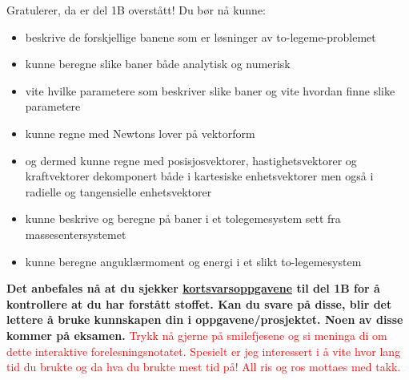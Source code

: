 \documentclass{beamer}
\let\hrefori\href
\renewcommand{\href}[2]{{\setlength{\fboxsep}{1pt}\colorbox{sunset}{\hrefori{#1}{#2}}}}
\newcommand{\pagebutton}[1]{\setbeamertemplate{button}{\tikz\node[inner xsep = 5pt, draw = structure!90, fill = green(ryb), rounded corners = 8pt]{\color{amber}\Large\insertbuttontext};}\beamerbutton{#1}}
\begin{document}
\begin{frame}
\label{oppsummering}
\hyperlink{koding3}{\pagebutton{\small Forrige side}}\href{https://nettskjema.no/a/158672}{ \Changey[1][yellow]{-2}}
Gratulerer, da er del 1B overstått! Du bør nå kunne:
\begin{itemize}
\item beskrive de forskjellige banene som er løsninger av to-legeme-problemet
\item kunne beregne slike baner både analytisk og numerisk
\item vite hvilke parametere som beskriver slike baner og vite hvordan finne slike parametere
\item kunne regne med Newtons lover på vektorform
\item og dermed kunne regne med posisjosvektorer, hastighetsvektorer og kraftvektorer dekomponert både i kartesiske enhetsvektorer men også i radielle og tangensielle enhetsvektorer
\item kunne beskrive og beregne på baner i et tolegemesystem sett fra massesentersystemet
\item kunne beregne anguklærmoment og energi i et slikt to-legemesystem
\end{itemize}
    {\bf\footnotesize Det anbefales nå at du sjekker \href{https://www.uio.no/studier/emner/matnat/astro/AST2000/h21/undervisningsmateriell/kortsvarsoppgaver/del1b.pdf}{kortsvarsoppgavene} til del 1B for å kontrollere at du har forstått stoffet. Kan du svare på disse, blir det lettere å bruke kunnskapen din i oppgavene/prosjektet. Noen av disse kommer på eksamen.}
\textcolor{red}{\footnotesize Trykk nå gjerne på smilefjesene og si meninga di om dette interaktive forelesningsnotatet. Spesielt er jeg interessert i å vite hvor lang tid du brukte og da hva du brukte mest tid på! All ris og ros mottaes med takk.}
\end{frame}
\end{document}
